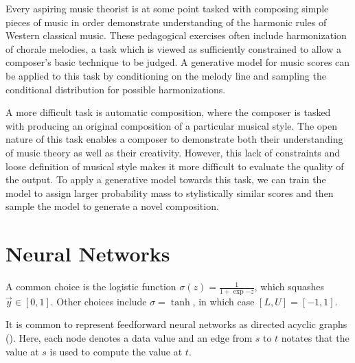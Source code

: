 



Every aspiring music theorist is at some point tasked with composing simple
pieces of music in order demonstrate understanding of the harmonic rules of
Western classical music. These pedagogical exercises often include
harmonization of chorale melodies, a task which is viewed as sufficiently
constrained to allow a composer's basic technique to be judged. A generative
model for music scores can be applied to this task by conditioning on the
melody line and sampling the conditional distribution for possible
harmonizations.

A more difficult task is automatic composition, where the composer is tasked
with producing an original composition of a particular musical style. The open
nature of this task enables a composer to demonstrate both their
understanding of music theory as well as their creativity. However, this lack of
constraints and loose definition of musical style makes it more difficult to
evaluate the quality of the output. To apply a generative model towards this
task, we can train the model to assign larger probability mass to stylistically
similar scores and then sample the model to generate a novel composition.



\section{Neural Networks}

A common choice is the logistic function $\sigma(z)
= \frac{1}{1+\exp{-z}}$, which squashes $\vec{y} \in [0, 1]$. Other choices
include $\sigma = \tanh$, in which case $[L, U] = [-1, 1]$.

It is common to represent feedforward neural networks as directed acyclic
graphs (). Here, each node denotes a data value and
an edge from $s$ to $t$ notates that the value at $s$ is used to compute the
value at $t$.

